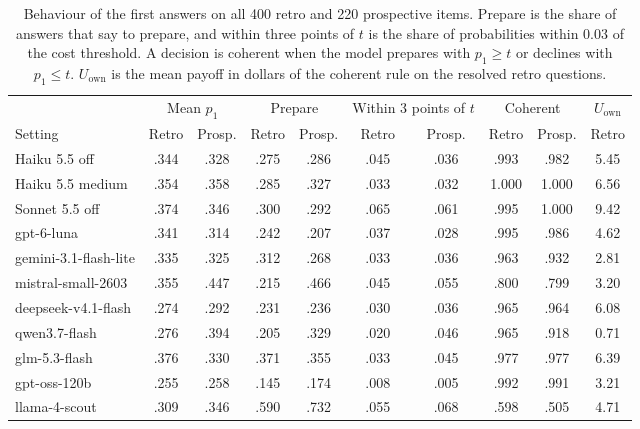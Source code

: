 \begin{table}[t]
\centering
\footnotesize
\setlength{\tabcolsep}{3pt}
\begin{adjustbox}{max width=\linewidth}
\begin{tabular}{lccccccccc}
\toprule
& \multicolumn{2}{c}{Mean $p_1$} & \multicolumn{2}{c}{Prepare} & \multicolumn{2}{c}{Within 3 points of $t$} & \multicolumn{2}{c}{Coherent} & $U_{\mathrm{own}}$ \\
Setting & Retro & Prosp. & Retro & Prosp. & Retro & Prosp. & Retro & Prosp. & Retro \\
\midrule
Haiku 5.5 off & .344 & .328 & .275 & .286 & .045 & .036 & .993 & .982 & 5.45 \\
Haiku 5.5 medium & .354 & .358 & .285 & .327 & .033 & .032 & 1.000 & 1.000 & 6.56 \\
Sonnet 5.5 off & .374 & .346 & .300 & .292 & .065 & .061 & .995 & 1.000 & 9.42 \\
gpt-6-luna & .341 & .314 & .242 & .207 & .037 & .028 & .995 & .986 & 4.62 \\
gemini-3.1-flash-lite & .335 & .325 & .312 & .268 & .033 & .036 & .963 & .932 & 2.81 \\
mistral-small-2603 & .355 & .447 & .215 & .466 & .045 & .055 & .800 & .799 & 3.20 \\
deepseek-v4.1-flash & .274 & .292 & .231 & .236 & .030 & .036 & .965 & .964 & 6.08 \\
qwen3.7-flash & .276 & .394 & .205 & .329 & .020 & .046 & .965 & .918 & 0.71 \\
glm-5.3-flash & .376 & .330 & .371 & .355 & .033 & .045 & .977 & .977 & 6.39 \\
gpt-oss-120b & .255 & .258 & .145 & .174 & .008 & .005 & .992 & .991 & 3.21 \\
llama-4-scout & .309 & .346 & .590 & .732 & .055 & .068 & .598 & .505 & 4.71 \\
\bottomrule
\end{tabular}
\end{adjustbox}
\caption{Behaviour of the first answers on all 400 retro and 220 prospective items. Prepare is the share of answers that say to prepare, and within three points of $t$ is the share of probabilities within 0.03 of the cost threshold. A decision is coherent when the model prepares with $p_1\geq t$ or declines with $p_1\leq t$. $U_{\mathrm{own}}$ is the mean payoff in dollars of the coherent rule on the resolved retro questions.}
\label{tab:behaviour}
\end{table}
